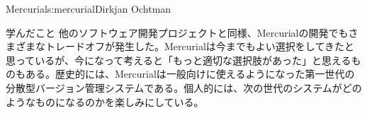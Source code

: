 \begin{aosachapter}{Mercurial}{s:mercurial}{Dirkjan Ochtman}
\begin{aosasect1}{学んだこと}
他のソフトウェア開発プロジェクトと同様、Mercurialの開発でもさまざまなトレードオフが発生した。Mercurialは今までもよい選択をしてきたと思っているが、今になって考えると「もっと適切な選択肢があった」と思えるものもある。歴史的には、Mercurialは一般向けに使えるようになった第一世代の分散型バージョン管理システムである。個人的には、次の世代のシステムがどのようなものになるのかを楽しみにしている。

\end{aosasect1}

\end{aosachapter}
